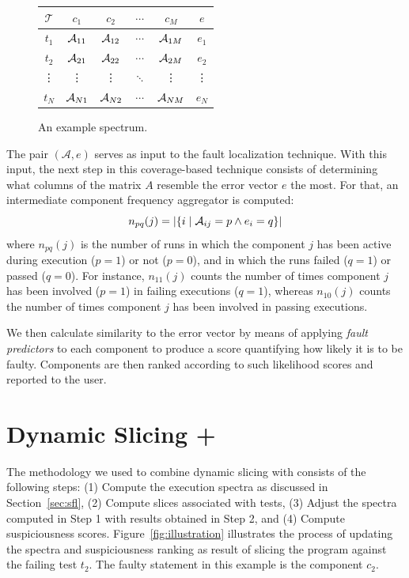 \documentclass[sigplan,10pt,review,anonymous]{acmart}\settopmatter{printfolios=true,printccs=false,printacmref=false}
\begin{document}
\begin{figure}[h!]
    \centering
    \begin{tabular}{c|cccc|c}
      $\mathcal{T}$ & $c_1$    & $c_2$    & $\cdots$ & $c_M$    & $e$    \\ \hline
      $t_1$         & $\mathcal{A}_{11}$ & $\mathcal{A}_{12}$ & $\cdots$ & $\mathcal{A}_{1M}$ & $e_1$  \\
      $t_2$         & $\mathcal{A}_{21}$ & $\mathcal{A}_{22}$ & $\cdots$ & $\mathcal{A}_{2M}$ & $e_2$  \\
      \vdots        & \vdots   & \vdots   & $\ddots$ & \vdots   & \vdots \\
      $t_N$         & $\mathcal{A}_{N1}$ & $\mathcal{A}_{N2}$ & $\cdots$ & $\mathcal{A}_{NM}$ & $e_N$  \\
    \end{tabular}
    \caption{An example spectrum.}
    \label{fig:spectrum-example}
\end{figure}

The pair $(\mathcal{A},e)$ serves as input to the fault localization technique.
With this input, the next step in this coverage-based technique consists of determining what columns
of the matrix $A$ resemble the error vector $e$ the most.
For that, an intermediate component frequency aggregator is computed:
%
\begin{equation}\label{eq:occurrence}
 n_{pq}(j) = |\{i\mid \mathcal{A}_{ij}=p \wedge e_i=q\}|
\end{equation}
%
\noindent where $n_{pq}(j)$ is the number of runs in which the
component $j$ has been active during execution ($p = 1$) or not
($p=0$), and in which the runs failed ($q = 1$) or passed ($q = 0$).
For instance, $n_{11}(j)$ counts the number of times component $j$ has
been involved ($p = 1$) in failing executions ($q = 1$), whereas
$n_{10}(j)$ counts the number of times component $j$ has been involved
in passing executions.

We then calculate similarity to the error vector by means of applying \emph{fault predictors} to
each component to produce a score quantifying how likely it is to be faulty.
Components are then ranked according to such likelihood scores and reported to the user.

\section{Dynamic Slicing + \sfl{}}
\label{sec:combination}

The methodology we used to combine dynamic slicing with \sfl{}
consists of the following steps: (1) Compute the execution spectra as
discussed in Section~\ref{sec:sfl}, (2) Compute slices associated with
tests, (3) Adjust the spectra computed in Step 1 with results obtained
in Step 2, and (4) Compute suspiciousness
scores. Figure~\ref{fig:illustration} illustrates the process of
updating the spectra and suspiciousness ranking as result of slicing
the program against the failing test $t_2$.  The faulty statement in
this example is the component $c_2$.
\end{document}
